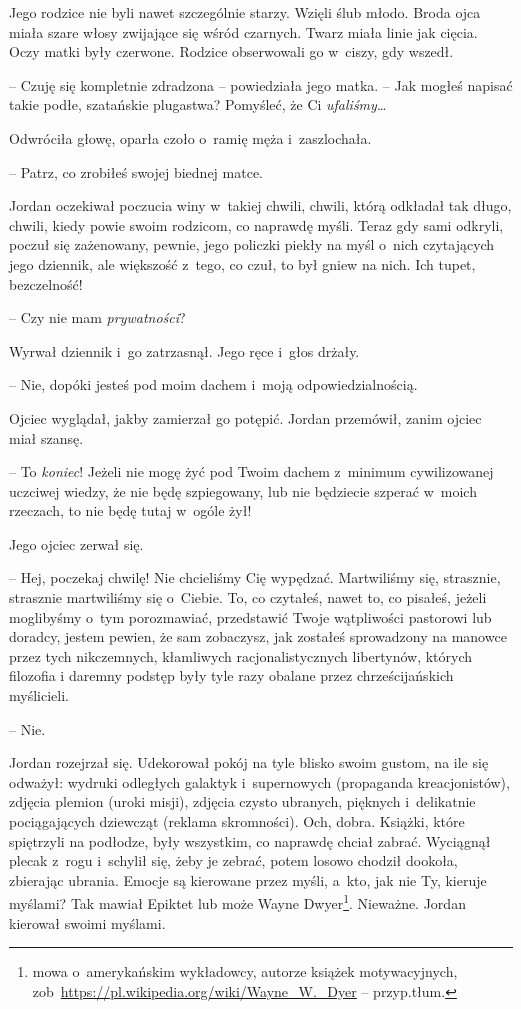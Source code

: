 \documentclass[oneside,polish,11pt,sfheadings]{mwbk}
\begin{document}
Jego rodzice nie byli nawet szczególnie starzy. Wzięli ślub młodo. Broda
ojca miała szare włosy zwijające się wśród czarnych. Twarz miała linie
jak cięcia. Oczy matki były czerwone. Rodzice obserwowali go w~ciszy,
gdy wszedł.

-- Czuję się kompletnie zdradzona -- powiedziała jego matka. -- Jak mogłeś
napisać takie podłe, szatańskie plugastwa? Pomyśleć, że Ci
\emph{ufaliśmy}\ldots

Odwróciła głowę, oparła czoło o~ramię męża i~zaszlochała.

-- Patrz, co zrobiłeś swojej biednej matce.

Jordan oczekiwał poczucia winy w~takiej chwili, chwili, którą odkładał
tak długo, chwili, kiedy powie swoim rodzicom, co naprawdę myśli. Teraz
gdy sami odkryli, poczuł się zażenowany, pewnie, jego policzki piekły na
myśl o~nich czytających jego dziennik, ale większość z~tego, co czuł, to
był gniew na nich. Ich tupet, bezczelność!

-- Czy nie mam \emph{prywatności}?

Wyrwał dziennik i~go zatrzasnął. Jego ręce i~głos drżały.

-- Nie, dopóki jesteś pod moim dachem i~moją odpowiedzialnością.

Ojciec wyglądał, jakby zamierzał go potępić. Jordan przemówił, zanim
ojciec miał szansę.

-- To \emph{koniec}! Jeżeli nie mogę żyć pod Twoim dachem z~minimum
cywilizowanej uczciwej wiedzy, że nie będę szpiegowany, lub nie będziecie
szperać w~moich rzeczach, to nie będę tutaj w~ogóle żył!

Jego ojciec zerwał się. 

-- Hej, poczekaj chwilę! Nie chcieliśmy Cię
wypędzać. Martwiliśmy się, strasznie, strasznie martwiliśmy się o~Ciebie. To, co czytałeś, nawet to, co pisałeś, jeżeli moglibyśmy o~tym
porozmawiać, przedstawić Twoje wątpliwości pastorowi lub doradcy, jestem
pewien, że sam zobaczysz, jak zostałeś sprowadzony na manowce przez tych
nikczemnych, kłamliwych racjonalistycznych libertynów, których filozofia
i daremny podstęp były tyle razy obalane przez chrześcijańskich
myślicieli.

-- Nie.

Jordan rozejrzał się. Udekorował pokój na tyle blisko swoim gustom, na
ile się odważył: wydruki odległych galaktyk i~supernowych (propaganda
kreacjonistów), zdjęcia plemion (uroki misji), zdjęcia czysto ubranych,
pięknych i~delikatnie pociągających dziewcząt (reklama skromności). Och,
dobra. Książki, które spiętrzyli na podłodze, były wszystkim, co
naprawdę chciał zabrać. Wyciągnął plecak z~rogu i~schylił się, żeby je
zebrać, potem losowo chodził dookoła, zbierając ubrania. Emocje są
kierowane przez myśli, a~kto, jak nie Ty, kieruje myślami? Tak mawiał
Epiktet lub może Wayne Dwyer\footnote{mowa o~amerykańskim wykładowcy, autorze
książek motywacyjnych,
zob~\url{https://pl.wikipedia.org/wiki/Wayne\_W.\_Dyer} --
przyp.tłum.}. Nieważne. Jordan kierował swoimi myślami.
\end{document}
